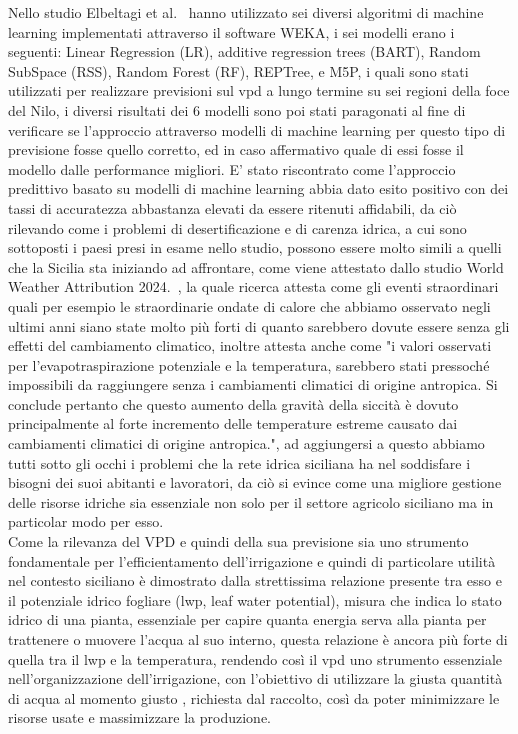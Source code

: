 Nello studio Elbeltagi et al.~\cite{elbeltagi2023vpd} hanno utilizzato sei diversi algoritmi di machine learning implementati attraverso il software WEKA, i sei modelli erano i seguenti:  Linear Regression (LR), additive regression trees (BART), Random SubSpace (RSS), Random Forest (RF), REPTree, e M5P, i quali sono stati utilizzati per realizzare previsioni sul vpd a lungo termine su sei regioni della foce del Nilo, i diversi risultati dei 6 modelli sono poi stati paragonati al fine di verificare se l'approccio attraverso modelli di machine learning per questo tipo di previsione fosse quello corretto, ed in caso affermativo quale di essi fosse il modello dalle performance migliori. E' stato riscontrato come l'approccio predittivo basato su modelli di machine learning abbia dato esito positivo con dei tassi di accuratezza abbastanza elevati da essere ritenuti affidabili, da ciò rilevando come i problemi di desertificazione e di carenza idrica, a cui sono sottoposti i paesi presi in esame nello studio, possono essere molto simili a quelli che la Sicilia sta iniziando ad affrontare, come viene attestato dallo studio World Weather Attribution 2024.~\cite{wwa2024sicily}, la quale ricerca attesta come gli eventi straordinari quali per esempio le straordinarie ondate di calore che abbiamo osservato negli ultimi anni siano state molto più forti di quanto sarebbero dovute essere senza gli effetti del cambiamento climatico, inoltre attesta anche come "i valori osservati per l'evapotraspirazione potenziale e la temperatura, sarebbero stati pressoché impossibili da raggiungere senza i cambiamenti climatici di origine antropica. Si conclude pertanto che questo aumento della gravità della siccità è dovuto principalmente al forte incremento delle temperature estreme causato dai cambiamenti climatici di origine antropica.", ad aggiungersi a questo abbiamo tutti sotto gli occhi i problemi che la rete idrica siciliana ha nel soddisfare i bisogni dei suoi abitanti e lavoratori, da ciò si evince come una migliore gestione delle risorse idriche sia essenziale non solo per il settore agricolo siciliano ma in particolar modo per esso.\\
Come la rilevanza del VPD e quindi della sua previsione sia uno strumento fondamentale per l'efficientamento dell'irrigazione e quindi di particolare utilità nel contesto siciliano è dimostrato dalla strettissima relazione presente tra esso e il potenziale idrico fogliare (lwp, leaf water potential), misura che indica lo stato idrico di una pianta, essenziale per capire quanta energia serva alla pianta per trattenere o muovere l'acqua al suo interno, questa relazione è ancora più forte di quella tra il lwp e la temperatura, rendendo così il vpd uno strumento essenziale nell'organizzazione dell'irrigazione, con l'obiettivo di utilizzare la giusta quantità di acqua al momento giusto , richiesta dal raccolto, così da poter minimizzare le risorse usate e massimizzare la produzione.
